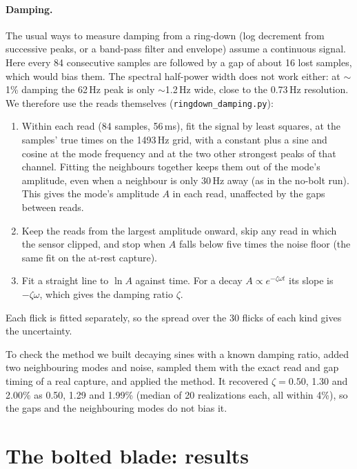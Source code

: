 \documentclass[11pt]{article}
\newcommand{\code}[1]{\texttt{#1}}
\begin{document}
\paragraph{Damping.} The usual ways to measure damping from a ring-down
(log decrement from successive peaks, or a band-pass filter and envelope)
assume a continuous signal. Here every 84 consecutive samples are followed by
a gap of about 16 lost samples, which would bias them. The spectral
half-power width does not work either: at $\sim$1\% damping the 62\,Hz peak is
only $\sim$1.2\,Hz wide, close to the 0.73\,Hz resolution. We therefore use
the reads themselves (\code{ringdown\_damping.py}):
\begin{enumerate}
  \item Within each read (84 samples, 56\,ms), fit the signal by least
        squares, at the samples' true times on the 1493\,Hz grid, with a
        constant plus a sine and cosine at the mode frequency and at the two
        other strongest peaks of that channel. Fitting the neighbours together
        keeps them out of the mode's amplitude, even when a neighbour is only
        30\,Hz away (as in the no-bolt run). This gives the mode's amplitude
        $A$ in each read, unaffected by the gaps between reads.
  \item Keep the reads from the largest amplitude onward, skip any read in
        which the sensor clipped, and stop when $A$ falls below five times the
        noise floor (the same fit on the at-rest capture).
  \item Fit a straight line to $\ln A$ against time. For a decay
        $A \propto e^{-\zeta\omega t}$ its slope is $-\zeta\omega$, which
        gives the damping ratio $\zeta$.
\end{enumerate}
Each flick is fitted separately, so the spread over the 30 flicks of each
kind gives the uncertainty.

To check the method we built decaying sines with a known damping ratio, added
two neighbouring modes and noise, sampled them with the exact read and gap
timing of a real capture, and applied the method. It recovered
$\zeta = 0.50$, 1.30 and 2.00\% as 0.50, 1.29 and 1.99\% (median of 20
realizations each, all within 4\%), so the gaps and the neighbouring modes do
not bias it.

\section{The bolted blade: results}
\label{sec:bolted}
\end{document}
